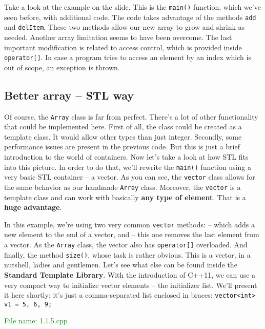 Take a look at the example on the slide. This is the \texttt{main()} function, 
which we’ve seen before, with additional code. The code takes advantage of the methods 
\texttt{add} and \texttt{delItem}. These two methods allow our new array to grow and 
shrink as needed. Another array limitation seems to have been overcome. The last important 
modification is related to access control, which is provided inside \texttt{operator[]}. 
In case a program tries to access an element by an index which is out of scope, an exception is thrown.

\subsection{Better array – STL way} %

Of course, the \texttt{Array} class is far from perfect. There’s a lot of other functionality 
that could be implemented here. First of all, the class could be created as a template class. 
It would allow other types than just integer. Secondly, some performance issues are present in 
the previous code. But this is just a brief introduction to the world of containers. 
Now let’s take a look at how STL fits into this picture. In order to do that, we’ll rewrite 
the \texttt{main()} function using a very basic STL container – a vector. As you can see, 
the \texttt{vector} class allows for the same behavior as our handmade \texttt{Array} class. 
Moreover, the \texttt{vector} is a template class and can work with basically 
\textbf{any type of element}. That is a \textbf{huge advantage}.

In this example, we’re using two very common \texttt{vector} methods: 
 – which adds a new element to the end of a vector, 
and  – this one removes the last element from a vector.
As the \texttt{Array} class, the vector also has \texttt{operator[]} overloaded. 
And finally, the method \texttt{size()}, whose task is rather obvious. This is a vector, 
in a nutshell, ladies and gentlemen. Let’s see what else can be found inside the 
\textbf{Standard Template Library}. With the introduction of C++11, we can use a very 
compact way to initialize vector elements – the initializer list. We’ll present it here 
shortly; it’s just a comma-separated list enclosed in braces: \texttt{vector<int> v1 = {5, 6, 9};}

\textcolor{green}{File name: 1.1.5.cpp}


